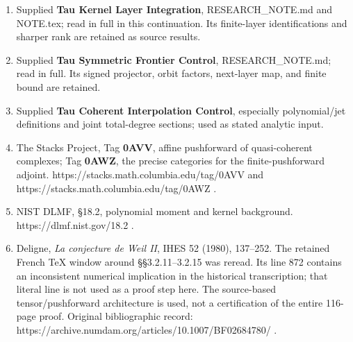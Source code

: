 \begin{enumerate}
\def\labelenumi{\arabic{enumi}.}
\tightlist
\item
  Supplied \textbf{Tau Kernel Layer Integration}, RESEARCH\_NOTE.md and
  NOTE.tex; read in full in this continuation. Its finite-layer
  identifications and sharper rank are retained as source results.
\item
  Supplied \textbf{Tau Symmetric Frontier Control}, RESEARCH\_NOTE.md;
  read in full. Its signed projector, orbit factors, next-layer map, and
  finite bound are retained.
\item
  Supplied \textbf{Tau Coherent Interpolation Control}, especially
  polynomial/jet definitions and joint total-degree sections; used as
  stated analytic input.
\item
  The Stacks Project, Tag \textbf{0AVV}, affine pushforward of
  quasi-coherent complexes; Tag \textbf{0AWZ}, the precise categories
  for the finite-pushforward adjoint.
  https://stacks.math.columbia.edu/tag/0AVV and
  https://stacks.math.columbia.edu/tag/0AWZ .
\item
  NIST DLMF, §18.2, polynomial moment and kernel background.
  https://dlmf.nist.gov/18.2 .
\item
  Deligne, \emph{La conjecture de Weil II}, IHES 52 (1980), 137--252.
  The retained French TeX window around §§3.2.11--3.2.15 was reread. Its
  line 872 contains an inconsistent numerical implication in the
  historical transcription; that literal line is not used as a proof
  step here. The source-based tensor/pushforward architecture is used,
  not a certification of the entire 116-page proof. Original
  bibliographic record:
  https://archive.numdam.org/articles/10.1007/BF02684780/ .
\end{enumerate}


